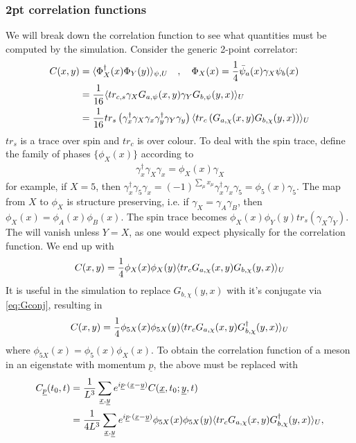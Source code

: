 \subsubsection{2pt correlation functions}
We will break down the correlation function to see what quantities must be computed by the simulation. Consider the generic 2-point correlator:
\begin{align}
	C(x,y) &= \langle \Phi^{\dagger}_X(x) \Phi_Y(y) \rangle_{\psi,U} \quad , \quad \Phi_X(x) = {1\over 4}\bar{\psi}_a(x) \gamma_X \psi_b(x) \\
	&= {1\over 16}\langle tr_{c,s} \gamma_X G_{a,\psi}(x,y) \gamma_Y G_{b,\psi}(y,x) \rangle_U \\
	&= {1\over 16}tr_s \left( \gamma^{\dagger}_x \gamma_X \gamma_x \gamma_y^{\dagger} \gamma_Y \gamma_y \right)
	\langle tr_c \left( G_{a,\chi}(x,y) G_{b,\chi}(y,x) \right) \rangle_U
\end{align}
$tr_s$ is a trace over spin and $tr_c$ is over colour. To deal with the spin trace, define the family of phases $\{\phi_X(x)\}$ according to
\begin{align}
	\gamma^{\dagger}_x\gamma_X\gamma_x = \phi_X(x) \gamma_X
\end{align}
for example, if $X=5$, then $\gamma^{\dagger}_x\gamma_5\gamma_x = (-1)^{\sum_{\mu}x_{\mu}} \gamma^{\dagger}_x\gamma_x \gamma_5 = \phi_5(x) \gamma_5$. The map from $X$ to $\phi_X$ is structure preserving, i.e. if $\gamma_X=\gamma_A\gamma_B$, then $\phi_X(x)=\phi_A(x)\phi_B(x)$. The spin trace becomes $\phi_X(x)\phi_Y(y) tr_s\left( \gamma_X \gamma_Y \right)$. The will vanish unless $Y=X$, as one would expect physically for the correlation function. We end up with
\begin{align}
	C(x,y) = {1\over 4} \phi_X(x)\phi_X(y) \langle tr_c G_{a,\chi}(x,y) G_{b,\chi}(y,x) \rangle_U
\end{align}
It is useful in the simulation to replace $G_{b,\chi}(y,x)$ with it's conjugate via \eqref{eq:Gconj}, resulting in
\begin{align}
	C(x,y) = {1\over 4} \phi_{5X}(x)\phi_{5X}(y) \langle tr_c G_{a,\chi}(x,y) G^{\dagger}_{b,\chi}(y,x) \rangle_U
\end{align}
where $\phi_{5X}(x) = \phi_5(x)\phi_X(x)$. To obtain the correlation function of a meson in an eigenstate with momentum ${\underline{p}}$, the above must be replaced with
\begin{align}
	C_{\underline{p}}(t_0,t) &= {1\over L^3} \sum_{\underline{x},\underline{y}} e^{i\underline{p}\cdot(\underline{x}-\underline{y})}
	C(\underline{x},t_0;\underline{y},t) \\
	&= {1\over 4 L^3} \sum_{\underline{x},\underline{y}} e^{i\underline{p}\cdot(\underline{x}-\underline{y})} \phi_{5X}(x)\phi_{5X}(y) \langle tr_c G_{a,\chi}(x,y)G^{\dagger}_{b,\chi}(y,x)\rangle_U,
\end{align}
